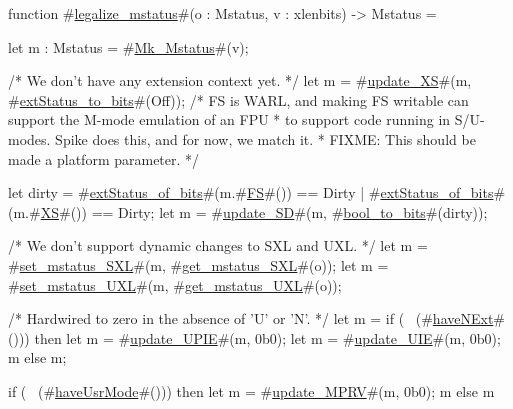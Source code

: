function #\hyperref[sailRISCVzlegalizzezymstatus]{legalize\_mstatus}#(o : Mstatus, v : xlenbits) -> Mstatus = {
  let m : Mstatus = #\hyperref[sailRISCVzMkzyMstatus]{Mk\_Mstatus}#(v);

  /* We don't have any extension context yet. */
  let m = #\hyperref[sailRISCVzupdatezyXS]{update\_XS}#(m, #\hyperref[sailRISCVzextStatuszytozybits]{extStatus\_to\_bits}#(Off));
  /* FS is WARL, and making FS writable can support the M-mode emulation of an FPU
   * to support code running in S/U-modes.  Spike does this, and for now, we match it.
   * FIXME: This should be made a platform parameter.
   */

  let dirty = #\hyperref[sailRISCVzextStatuszyofzybits]{extStatus\_of\_bits}#(m.#\hyperref[sailRISCVzFS]{FS}#()) == Dirty | #\hyperref[sailRISCVzextStatuszyofzybits]{extStatus\_of\_bits}#(m.#\hyperref[sailRISCVzXS]{XS}#()) == Dirty;
  let m = #\hyperref[sailRISCVzupdatezySD]{update\_SD}#(m, #\hyperref[sailRISCVzboolzytozybits]{bool\_to\_bits}#(dirty));

  /* We don't support dynamic changes to SXL and UXL. */
  let m = #\hyperref[sailRISCVzsetzymstatuszySXL]{set\_mstatus\_SXL}#(m, #\hyperref[sailRISCVzgetzymstatuszySXL]{get\_mstatus\_SXL}#(o));
  let m = #\hyperref[sailRISCVzsetzymstatuszyUXL]{set\_mstatus\_UXL}#(m, #\hyperref[sailRISCVzgetzymstatuszyUXL]{get\_mstatus\_UXL}#(o));

  /* Hardwired to zero in the absence of 'U' or 'N'. */
  let m = if (~ (#\hyperref[sailRISCVzhaveNExt]{haveNExt}#())) then {
             let m = #\hyperref[sailRISCVzupdatezyUPIE]{update\_UPIE}#(m, 0b0);
             let m = #\hyperref[sailRISCVzupdatezyUIE]{update\_UIE}#(m, 0b0);
             m
          } else m;

  if (~ (#\hyperref[sailRISCVzhaveUsrMode]{haveUsrMode}#())) then {
    let m = #\hyperref[sailRISCVzupdatezyMPRV]{update\_MPRV}#(m, 0b0);
    m
  } else m
}

